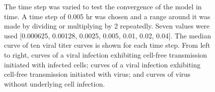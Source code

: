 \begin{figure}
{    }

\caption{The time step was varied to test the convergence of the model in time. A time step of 0.005 hr was chosen and a range around it was made by dividing or multiplying by 2 repeatedly. Seven values were used [0.000625, 0.00128, 0.0025, 0.005, 0.01, 0.02, 0.04]. The median curve of ten viral titer curves is shown for each time step. From left to right, curves of a viral infection exhibiting cell-free transmission initiated with infected cells; curves of a viral infection exhibiting cell-free transmission initiated with virus; and curves of virus without underlying cell infection. \label{fig:ViralTiterCurves}}
\end{figure}



